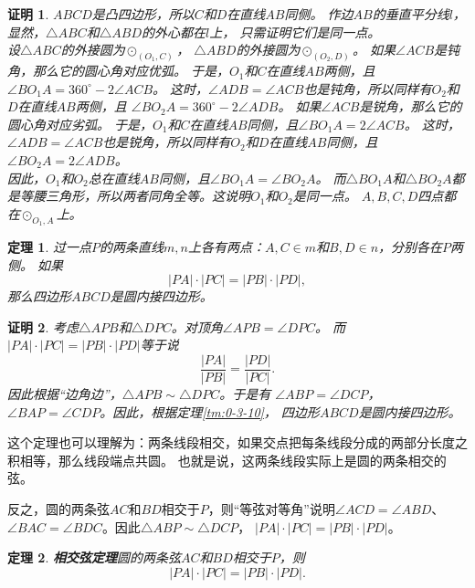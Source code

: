 \documentclass[12pt,UTF8]{ctexbook}
\newtheorem{tm}{定理}[section]
\newtheorem*{proof2}{证明}
\begin{document}
\begin{proof2}
    $ABCD$是凸四边形，所以$C$和$D$在直线$AB$同侧。
    作边$AB$的垂直平分线$l$，显然，$\triangle ABC$和$\triangle ABD$的外心都在$l$上，
    只需证明它们是同一点。\\
    设$\triangle ABC$的外接圆为$\odot_{(O_1, C)}$，
    $\triangle ABD$的外接圆为$\odot_{(O_2, D)}$。
    如果$\angle ACB$是钝角，那么它的圆心角对应优弧。
    于是，$O_1$和$C$在直线$AB$两侧，且$\angle BO_1A = 360^\circ - 2\angle ACB$。
    这时，$\angle ADB = \angle ACB$也是钝角，所以同样有$O_2$和$D$在直线$AB$两侧，且
    $\angle BO_2A = 360^\circ - 2\angle ADB$。
    如果$\angle ACB$是锐角，那么它的圆心角对应劣弧。
    于是，$O_1$和$C$在直线$AB$同侧，且$\angle BO_1A = 2\angle ACB$。
    这时，$\angle ADB = \angle ACB$也是锐角，所以同样有$O_2$和$D$在直线$AB$同侧，且
    $\angle BO_2A = 2\angle ADB$。\\
    因此，$O_1$和$O_2$总在直线$AB$同侧，且$\angle BO_1A = \angle BO_2A$。
    而$\triangle BO_1A$和$\triangle BO_2A$都是等腰三角形，所以两者同角全等。这说明$O_1$和$O_2$是同一点。
    $A,B,C,D$四点都在$\odot_{O_1, A}$上。
\end{proof2}

\begin{tm}\label{tm:0-3-20}
    过一点$P$的两条直线$m,n$上各有两点：$A, C\in m$和$B, D \in n$，分别各在$P$两侧。
    如果
    $$ |PA| \cdot |PC| = |PB| \cdot |PD|, $$
    那么四边形$ABCD$是圆内接四边形。
\end{tm}

\begin{proof2}
    考虑$\triangle APB$和$\triangle DPC$。对顶角$\angle APB = \angle DPC$。
    而$ |PA| \cdot |PC| = |PB| \cdot |PD|$等于说
    $$ \frac{|PA|}{|PB|} = \frac{|PD|}{|PC|}.$$
    因此根据“边角边”，$\triangle APB \sim \triangle DPC$。于是有
    $\angle ABP = \angle DCP$，$\angle BAP = \angle CDP$。因此，根据定理\ref{tm:0-3-10}，
    四边形$ABCD$是圆内接四边形。
\end{proof2}
这个定理也可以理解为：两条线段相交，如果交点把每条线段分成的两部分长度之积相等，那么线段端点共圆。
也就是说，这两条线段实际上是圆的两条相交的弦。

反之，圆的两条弦$AC$和$BD$相交于$P$，则“等弦对等角”说明$\angle ACD = \angle ABD$、
$\angle BAC = \angle BDC$。因此$\triangle ABP \sim \triangle DCP$，
$ |PA| \cdot |PC| = |PB| \cdot |PD|$。

\begin{tm}\textbf{相交弦定理}\label{tm:0-3-30}
    圆的两条弦$AC$和$BD$相交于$P$，则
    $$ |PA| \cdot |PC| = |PB| \cdot |PD|. $$
\end{tm}
\end{document}
